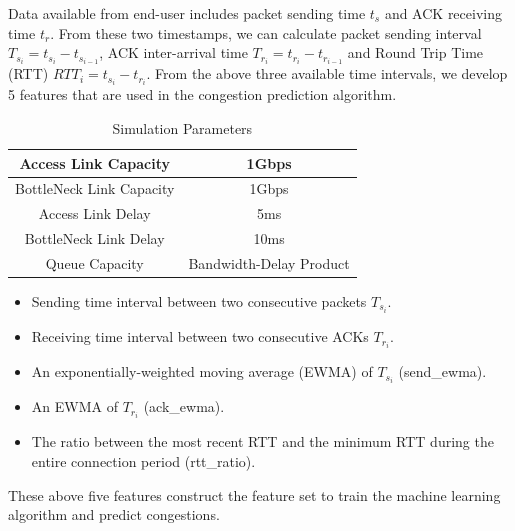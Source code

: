 \par Data available from end-user includes packet sending time $t_{s}$ and ACK receiving time $t_{r}$. From these two timestamps, we can calculate packet sending interval $T_{s_{i}} = t_{s_{i}} - t_{s_{i-1}}$, ACK inter-arrival time $T_{r_{i}} = t_{r_{i}} - t_{r_{i-1}}$ and Round Trip Time (RTT) $RTT_{i} = t_{s_{i}} - t_{r_{i}}$. From the above three available time intervals, we develop 5 features that are used in the congestion prediction algorithm.
\begin{table}
\begin{center}
\caption {Simulation Parameters} \label{tab:simuPara}
\begin{tabular}{ |c|c| }
 \hline
 Access Link Capacity & 1Gbps  \\
 \hline
 BottleNeck Link Capacity & 1Gbps  \\
 \hline
 Access Link Delay & 5ms  \\
 \hline
 BottleNeck Link Delay & 10ms\\
 \hline
 Queue Capacity & Bandwidth-Delay Product\\
 \hline
\end{tabular}
\end{center}
\end{table}
\begin{itemize}
\item Sending time interval between two consecutive packets $T_{s_{i}}$.
\item Receiving time interval between two consecutive ACKs $T_{r_{i}}$.
\item An exponentially-weighted moving average (EWMA) of $T_{s_{i}}$ (send\_ewma).
\item An EWMA of $T_{r_{i}}$ (ack\_ewma).
\item The ratio between the most recent RTT and the minimum RTT during the entire connection period (rtt\_ratio).
\end{itemize}

These above five features construct the feature set to train the machine learning algorithm and predict congestions.

